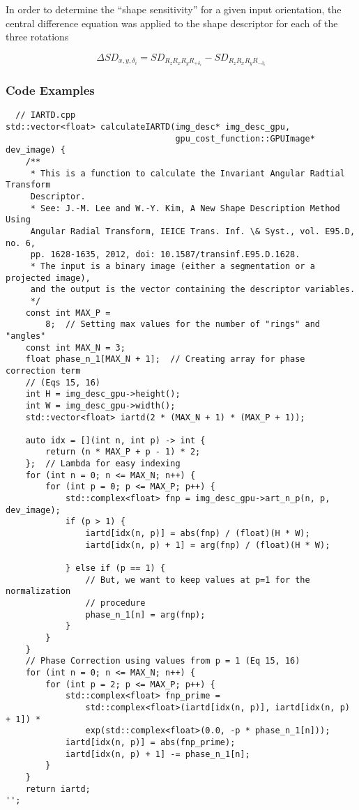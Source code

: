 In order to determine the ``shape sensitivity'' for a given input orientation, the central difference equation was applied to the shape descriptor for each of the three rotations

\begin{equation}
  \label{eq:shape-derivative}
  \Delta SD_{x,y,\delta_{i}} = SD_{R_{z}R_{x}R_{y}R_{+\delta_{i}}} - SD_{R_{z}R_{x}R_{y}R_{-\delta_{i}}}
\end{equation}


\subsubsection{Code Examples}

\begin{lstlisting}
  // IARTD.cpp
std::vector<float> calculateIARTD(img_desc* img_desc_gpu,
                                  gpu_cost_function::GPUImage* dev_image) {
    /**
     * This is a function to calculate the Invariant Angular Radtial Transform
     Descriptor.
     * See: J.-M. Lee and W.-Y. Kim, A New Shape Description Method Using
     Angular Radial Transform, IEICE Trans. Inf. \& Syst., vol. E95.D, no. 6,
     pp. 1628-1635, 2012, doi: 10.1587/transinf.E95.D.1628.
     * The input is a binary image (either a segmentation or a projected image),
     and the output is the vector containing the descriptor variables.
     */
    const int MAX_P =
        8;  // Setting max values for the number of "rings" and "angles"
    const int MAX_N = 3;
    float phase_n_1[MAX_N + 1];  // Creating array for phase correction term
    // (Eqs 15, 16)
    int H = img_desc_gpu->height();
    int W = img_desc_gpu->width();
    std::vector<float> iartd(2 * (MAX_N + 1) * (MAX_P + 1));

    auto idx = [](int n, int p) -> int {
        return (n * MAX_P + p - 1) * 2;
    };  // Lambda for easy indexing
    for (int n = 0; n <= MAX_N; n++) {
        for (int p = 0; p <= MAX_P; p++) {
            std::complex<float> fnp = img_desc_gpu->art_n_p(n, p, dev_image);
            if (p > 1) {
                iartd[idx(n, p)] = abs(fnp) / (float)(H * W);
                iartd[idx(n, p) + 1] = arg(fnp) / (float)(H * W);

            } else if (p == 1) {
                // But, we want to keep values at p=1 for the normalization
                // procedure
                phase_n_1[n] = arg(fnp);
            }
        }
    }
    // Phase Correction using values from p = 1 (Eq 15, 16)
    for (int n = 0; n <= MAX_N; n++) {
        for (int p = 2; p <= MAX_P; p++) {
            std::complex<float> fnp_prime =
                std::complex<float>(iartd[idx(n, p)], iartd[idx(n, p) + 1]) *
                exp(std::complex<float>(0.0, -p * phase_n_1[n]));
            iartd[idx(n, p)] = abs(fnp_prime);
            iartd[idx(n, p) + 1] -= phase_n_1[n];
        }
    }
    return iartd;
'';
\end{lstlisting}

